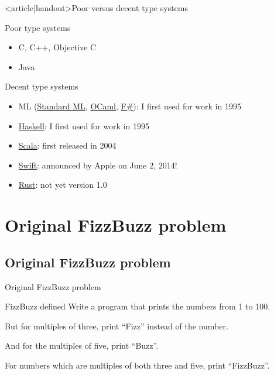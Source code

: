 \begin{frame}<article|handout>{Poor versus decent type systems}
  \begin{block}{Poor type systems}
    \begin{itemize}
    \item C, C++, Objective C
    \item Java
    \end{itemize}
  \end{block}

  \begin{block}{Decent type systems}
    \begin{itemize}
    \item ML (\href{http://www.smlnj.org/}{Standard ML}, \href{http://ocaml.org/}{OCaml}, \href{http://fsharp.org/}{F\#}): I first used for work in 1995
    \item \href{http://www.haskell.org/}{Haskell}: I first used for work in 1995
    \item \href{http://www.scala-lang.org/}{Scala}: first released in 2004
    \item \href{http://developer.apple.com/swift/}{Swift}: announced by Apple on June 2, 2014!
    \item \href{http://www.rust-lang.org/}{Rust}: not yet version 1.0
    \end{itemize}
  \end{block}
\end{frame}

\section{Original FizzBuzz problem}

\subsection{Original FizzBuzz problem}

\begin{frame}{Original FizzBuzz problem}
  \begin{block}{FizzBuzz defined}
    Write a program that prints the numbers from 1 to 100.

    But for multiples of three, print ``Fizz'' instead of the number.

    And for the multiples of five, print ``Buzz''.

    For numbers which are multiples of both three and five, print ``FizzBuzz''.
  \end{block}
\end{frame}

